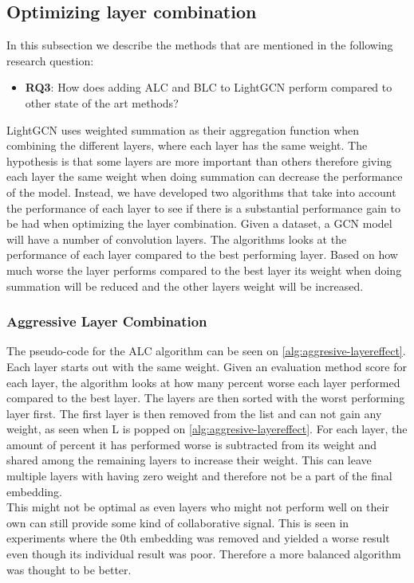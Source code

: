 \subsection{Optimizing layer combination}\label{fredsplit}
In this subsection we describe the methods that are mentioned in the following research question:
\begin{itemize}
    \item \textbf{RQ3}: How does adding ALC and BLC to LightGCN perform compared to other state of the art methods?
\end{itemize}
LightGCN uses weighted summation as their aggregation function when combining the different layers, where each layer has the same weight.
The hypothesis is that some layers are more important than others therefore giving each layer the same weight when doing summation can decrease the performance of the model.
Instead, we have developed two algorithms that take into account the performance of each layer to see if there is a substantial performance gain to be had when optimizing the layer combination.
Given a dataset, a GCN model will have a number of convolution layers.
The algorithms looks at the performance of each layer compared to the best performing layer.
Based on how much worse the layer performs compared to the best layer its weight when doing summation will be reduced and the other layers weight will be increased.

\subsubsection{Aggressive Layer Combination}
The pseudo-code for the ALC algorithm can be seen on \autoref{alg:aggresive-layereffect}.
Each layer starts out with the same weight.
Given an evaluation method score for each layer, the algorithm looks at how many percent worse each layer performed compared to the best layer.
The layers are then sorted with the worst performing layer first.
The first layer is then removed from the list and can not gain any weight, as seen when L is popped on \autoref{alg:aggresive-layereffect}.
For each layer, the amount of percent it has performed worse is subtracted from its weight and shared among the remaining layers to increase their weight.
This can leave multiple layers with having zero weight and therefore not be a part of the final embedding.
\\
This might not be optimal as even layers who might not perform well on their own can still provide some kind of collaborative signal.
This is seen in experiments where the 0th embedding was removed and yielded a worse result even though its individual result was poor.
Therefore a more balanced algorithm was thought to be better.

